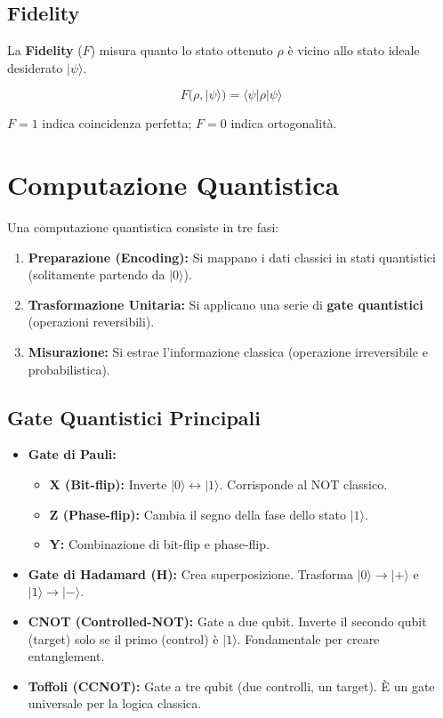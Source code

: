 \documentclass[12pt, a4paper]{article}
\begin{document}
\subsection{Fidelity}
La \textbf{Fidelity} ($F$) misura quanto lo stato ottenuto $\rho$ è vicino allo stato ideale desiderato $|\psi\rangle$.
\begin{tcolorbox}
\[
F(\rho, |\psi\rangle) = \langle\psi|\rho|\psi\rangle
\]
\end{tcolorbox}
$F=1$ indica coincidenza perfetta; $F=0$ indica ortogonalità.

\section{Computazione Quantistica}
Una computazione quantistica consiste in tre fasi:
\begin{enumerate}
    \item \textbf{Preparazione (Encoding):} Si mappano i dati classici in stati quantistici (solitamente partendo da $|0\rangle$).
    \item \textbf{Trasformazione Unitaria:} Si applicano una serie di \textbf{gate quantistici} (operazioni reversibili).
    \item \textbf{Misurazione:} Si estrae l'informazione classica (operazione irreversibile e probabilistica).
\end{enumerate}

\subsection{Gate Quantistici Principali}
\begin{itemize}
    \item \textbf{Gate di Pauli:}
    \begin{itemize}
        \item \textbf{X (Bit-flip):} Inverte $|0\rangle \leftrightarrow |1\rangle$. Corrisponde al NOT classico.
        \item \textbf{Z (Phase-flip):} Cambia il segno della fase dello stato $|1\rangle$.
        \item \textbf{Y:} Combinazione di bit-flip e phase-flip.
    \end{itemize}
    \item \textbf{Gate di Hadamard (H):} Crea superposizione. Trasforma $|0\rangle \to |+\rangle$ e $|1\rangle \to |-\rangle$.
    \item \textbf{CNOT (Controlled-NOT):} Gate a due qubit. Inverte il secondo qubit (target) solo se il primo (control) è $|1\rangle$. Fondamentale per creare entanglement.
    \item \textbf{Toffoli (CCNOT):} Gate a tre qubit (due controlli, un target). È un gate universale per la logica classica.
\end{itemize}
\end{document}
